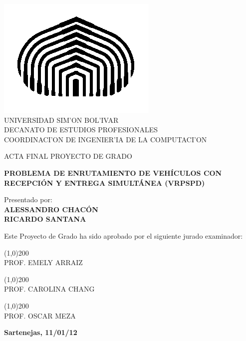 \begin{titlepage}
\begin{center}

\includegraphics[scale=0.5,type=png,ext=.png,read=.png]{figures/cebolla} \\

\textsc {\large UNIVERSIDAD SIM'ON BOL'IVAR} \\
\textsc{DECANATO DE ESTUDIOS PROFESIONALES\\
COORDINACI'ON DE INGENIER'IA DE LA COMPUTACI'ON}

\bigskip
\bigskip
\bigskip
\bigskip
\bigskip
\bigskip

\textsc{ACTA FINAL PROYECTO DE GRADO}

\bigskip
\bigskip

\textsc{\bfseries PROBLEMA DE ENRUTAMIENTO DE VEHÍCULOS CON RECEPCIÓN Y ENTREGA SIMULTÁNEA (VRPSPD)}

\bigskip
\bigskip
\bigskip
\bigskip

\begin{minipage}{\textwidth}
\centering
Presentado por: \\
\textsc{\bfseries ALESSANDRO CHACÓN} \\
\textsc{\bfseries RICARDO SANTANA} \\

\bigskip
\bigskip
\bigskip
\bigskip

Este Proyecto de Grado ha sido aprobado por el siguiente jurado examinador: \\

\bigskip
\bigskip

\line(1,0){200} \\
PROF. EMELY ARRAIZ\\

\bigskip
\bigskip

\line(1,0){200} \\
PROF. CAROLINA CHANG\\

\bigskip
\bigskip

\line(1,0){200} \\
PROF. OSCAR MEZA\\
\end{minipage}

\bigskip
\bigskip
\vfill

{\large \bfseries Sartenejas, 11/01/12}

\end{center}
\end{titlepage}